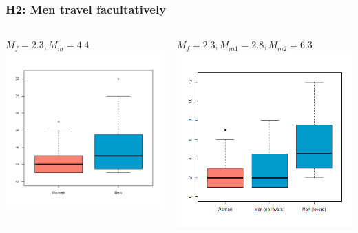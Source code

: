 \documentclass{beamer}
\begin{document}
\begin{frame}
\frametitle{H2: Men travel facultatively}

\begin{columns}
\begin{column}{.5\textwidth}
\textbf{$M_{f} = 2.3, M_{m} = 4.4$}
\includegraphics[width= 1\textwidth]{boxtot}
\end{column}

\begin{column}{.5\textwidth}
\textbf{$M_{f}=2.3, M_{m1}=2.8, M_{m2}=6.3$}
\includegraphics[width= 1\textwidth]{boxtot_rmv}
\end{column}


\end{columns}
\end{frame}
\end{document}
